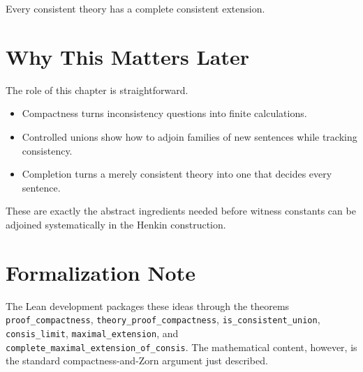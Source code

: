 \begin{corollary}
\label{cor:completion-of-consistent-theory}
Every consistent theory has a complete consistent extension.
\end{corollary}

\section{Why This Matters Later}

The role of this chapter is straightforward.

\begin{itemize}
\item Compactness turns inconsistency questions into finite calculations.
\item Controlled unions show how to adjoin families of new sentences while
tracking consistency.
\item Completion turns a merely consistent theory into one that decides every
sentence.
\end{itemize}

These are exactly the abstract ingredients needed before witness constants can
be adjoined systematically in the Henkin construction.

\section{Formalization Note}

The Lean development packages these ideas through the theorems
\texttt{proof\_compactness}, \texttt{theory\_proof\_compactness},
\texttt{is\_consistent\_union}, \texttt{consis\_limit},
\texttt{maximal\_extension}, and
\texttt{complete\_maximal\_extension\_of\_consis}. The mathematical content,
however, is the standard compactness-and-Zorn argument just described.
